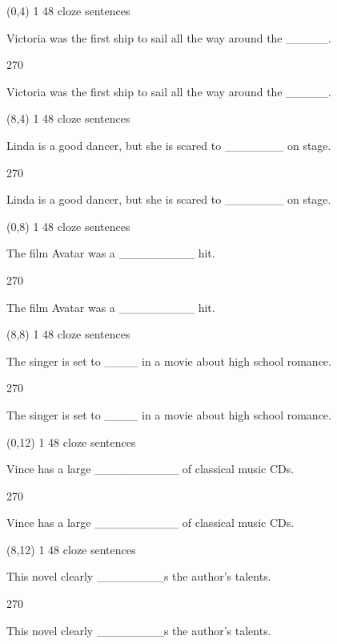 \documentclass[a4paper]{article}
\newenvironment{itemize*}%
{\begin{itemize}%
 \setlength{\itemsep}{0.5cm}%
 \setlength{\parsep}{0pt}%
 \setlength{\parskip}{0pt}}%
{\end{itemize}}
\newcommand{\mycard}[3]{%
	\small #1 #2
	\par
	\parbox[t][6.8cm][c]{9.5cm}{%
	\par
	\myleft{#3}
	\par
	\myright{#3}
	}
}
\newcommand{\myleft}[1]{%
	\begin{sideways}
	\hspace*{-0.9cm}
		\parbox[t][2.7cm][t]{6.5cm}{%
		\large #1
		}
	\end{sideways}
}
\newcommand{\myright}[1]{%
	\hspace*{6.5cm}
	\begin{turn}{270}
	\hspace*{-7.1cm}
		\parbox[t][2.7cm][t]{6.5cm}{%
		\large #1
		}
	\end{turn}
}
\begin{document}
\begin{textblock}{8}(0,4)
\mycard{1}{48 cloze sentences}{
\begin{itemize*}
\item Victoria was the first ship to sail all the way around the \_\_\_\_\_.
\end{itemize*}
}
\end{textblock}

\begin{textblock}{8}(8,4)
\mycard{1}{48 cloze sentences}{
\begin{itemize*}
\item Linda is a good dancer, but she is scared to \_\_\_\_\_\_\_ on stage.
\end{itemize*}
}
\end{textblock}

\begin{textblock}{8}(0,8)
\mycard{1}{48 cloze sentences}{
\begin{itemize*}
\item The film Avatar was a \_\_\_\_\_\_\_\_\_ hit.
\end{itemize*}
}
\end{textblock}

\begin{textblock}{8}(8,8)
\mycard{1}{48 cloze sentences}{
\begin{itemize*}
\item The singer is set to \_\_\_\_ in a movie about high school romance.
\end{itemize*}
}
\end{textblock}

\begin{textblock}{8}(0,12)
\mycard{1}{48 cloze sentences}{
\begin{itemize*}
\item Vince has a large \_\_\_\_\_\_\_\_\_\_ of classical music CDs.
\end{itemize*}
}
\end{textblock}

\begin{textblock}{8}(8,12)
\mycard{1}{48 cloze sentences}{
\begin{itemize*}
\item This novel clearly \_\_\_\_\_\_\_\_s the author's talents.
\end{itemize*}
}
\end{textblock}
\end{document}
